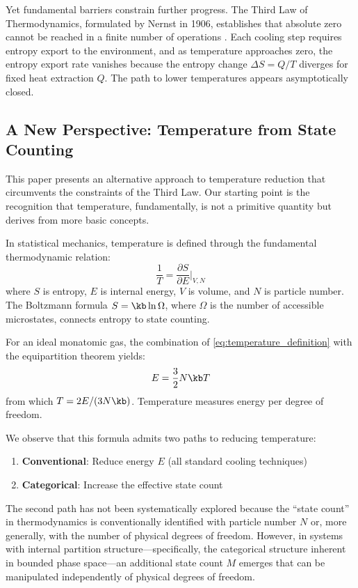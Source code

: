 Yet fundamental barriers constrain further progress. The Third Law of Thermodynamics, formulated by Nernst in 1906, establishes that absolute zero cannot be reached in a finite number of operations \cite{nernst1906,nernst1912}. Each cooling step requires entropy export to the environment, and as temperature approaches zero, the entropy export rate vanishes because the entropy change $\Delta S = Q/T$ diverges for fixed heat extraction $Q$. The path to lower temperatures appears asymptotically closed.

\subsection{A New Perspective: Temperature from State Counting}

This paper presents an alternative approach to temperature reduction that circumvents the constraints of the Third Law. Our starting point is the recognition that temperature, fundamentally, is not a primitive quantity but derives from more basic concepts.

In statistical mechanics, temperature is defined through the fundamental thermodynamic relation:
\begin{equation}
\frac{1}{T} = \frac{\partial S}{\partial E}\bigg|_{V,N}
\label{eq:temperature_definition}
\end{equation}
where $S$ is entropy, $E$ is internal energy, $V$ is volume, and $N$ is particle number. The Boltzmann formula $S = \kb \ln \Omega$, where $\Omega$ is the number of accessible microstates, connects entropy to state counting.

For an ideal monatomic gas, the combination of \eqref{eq:temperature_definition} with the equipartition theorem yields:
\begin{equation}
E = \frac{3}{2} N \kb T
\label{eq:equipartition}
\end{equation}
from which $T = 2E/(3N\kb)$. Temperature measures energy per degree of freedom.

We observe that this formula admits two paths to reducing temperature:
\begin{enumerate}
    \item \textbf{Conventional}: Reduce energy $E$ (all standard cooling techniques)
    \item \textbf{Categorical}: Increase the effective state count
\end{enumerate}

The second path has not been systematically explored because the ``state count'' in thermodynamics is conventionally identified with particle number $N$ or, more generally, with the number of physical degrees of freedom. However, in systems with internal partition structure---specifically, the categorical structure inherent in bounded phase space---an additional state count $M$ emerges that can be manipulated independently of physical degrees of freedom.

